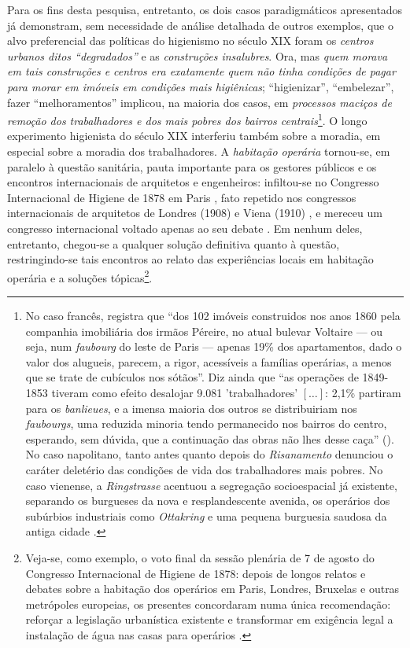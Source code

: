 Para os fins desta pesquisa, entretanto, os dois casos paradigmáticos apresentados já demonstram, sem necessidade de análise detalhada de outros exemplos, que o alvo preferencial das políticas do higienismo no século XIX foram os \textit{centros urbanos ditos ``degradados''} e as \textit{construções insalubres}. Ora, mas \textit{quem morava em tais construções e centros era exatamente quem não tinha condições de pagar para morar em imóveis em condições mais higiênicas}; ``higienizar'', ``embelezar'', fazer ``melhoramentos'' implicou, na maioria dos casos, em \textit{processos maciços de remoção dos trabalhadores e dos mais pobres dos bairros centrais}\footnote{No caso francês,  registra que ``dos 102 imóveis construidos nos anos 1860 pela companhia imobiliária dos irmãos Péreire, no atual bulevar Voltaire --- ou seja, num \textit{faubourg} do leste de Paris --- apenas 19\% dos apartamentos, dado o valor dos alugueis, parecem, a rigor, acessíveis a famílias operárias, a menos que se trate de cubículos nos sótãos''. Diz ainda que ``as operações de 1849-1853 tiveram como efeito desalojar 9.081 'trabalhadores' \([\dots]\): 2,1\% partiram para os \textit{banlieues}, e a imensa maioria dos outros se distribuiriam nos \textit{faubourgs}, uma reduzida minoria tendo permanecido nos bairros do centro, esperando, sem dúvida, que a continuação das obras não lhes desse caça'' (). No caso napolitano, tanto antes quanto depois do \textit{Risanamento}  denunciou o caráter deletério das condições de vida dos trabalhadores mais pobres. No caso vienense, a \textit{Ringstrasse} acentuou a segregação socioespacial já existente, separando os burgueses da nova e resplandescente avenida, os operários dos subúrbios industriais como \textit{Ottakring} e uma pequena burguesia saudosa da antiga cidade \cite[p.~26]{maderthanermuser_vienna_2003}.}. O longo experimento higienista do século XIX interferiu também sobre a moradia, em especial sobre a moradia dos trabalhadores. A \textit{habitação operária} tornou-se, em paralelo à questão sanitária, pauta importante para os gestores públicos e os encontros internacionais de arquitetos e engenheiros: infiltou-se no Congresso Internacional de Higiene de 1878 em Paris \cite{congres_hygiene_1878}, fato repetido nos congressos internacionais de arquitetos de Londres (1908) e Viena (1910) \cite{QUINTOJR1990}, e mereceu um congresso internacional voltado apenas ao seu debate \cite{fleming_housing_1897}. Em nenhum deles, entretanto, chegou-se a qualquer solução definitiva quanto à questão, restringindo-se tais encontros ao relato das experiências locais em habitação operária e a soluções tópicas\footnote{Veja-se, como exemplo, o voto final da sessão plenária de 7 de agosto do Congresso Internacional de Higiene de 1878: depois de longos relatos e debates sobre a habitação dos operários em Paris, Londres, Bruxelas e outras metrópoles europeias, os presentes concordaram numa única recomendação: reforçar a legislação urbanística existente e transformar em exigência legal a instalação de água nas casas para operários \cite[p.~597]{congres_hygiene_1878}.}.

